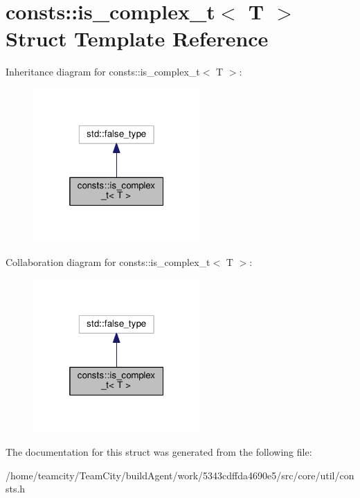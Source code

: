 \hypertarget{structconsts_1_1is__complex__t}{}\section{consts\+:\+:is\+\_\+complex\+\_\+t$<$ T $>$ Struct Template Reference}
\label{structconsts_1_1is__complex__t}


Inheritance diagram for consts\+:\+:is\+\_\+complex\+\_\+t$<$ T $>$\+:\nopagebreak
\begin{figure}[H]
\begin{center}
\leavevmode
\includegraphics[width=181pt]{structconsts_1_1is__complex__t__inherit__graph}
\end{center}
\end{figure}


Collaboration diagram for consts\+:\+:is\+\_\+complex\+\_\+t$<$ T $>$\+:\nopagebreak
\begin{figure}[H]
\begin{center}
\leavevmode
\includegraphics[width=181pt]{structconsts_1_1is__complex__t__coll__graph}
\end{center}
\end{figure}


The documentation for this struct was generated from the following file\+:\begin{DoxyCompactItemize}
\item 
/home/teamcity/\+Team\+City/build\+Agent/work/5343cdffda4690e5/src/core/util/consts.\+h\end{DoxyCompactItemize}
